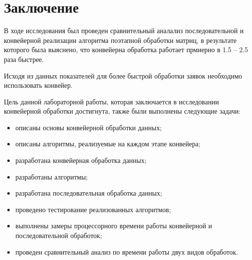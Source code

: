 \chapter*{Заключение}

В ходе исследования был проведен сравнительный аналализ последовательной и
конвейерной реализации алгоритма поэтапной обработки матриц, в результате
которого была выяснено, что конвейерна обработка работает прмиерно в 1.5 -- 2.5 раза 
быстрее. 

Исходя из данных показателей для более быстрой обработки заявок необходимо использовать
конвейер.

Цель данной лабораторной работы, которая заключается в исследовании
конвейерной обработки достигнута, также были выполнены следующие задачи:
\begin{itemize}[left=\parindent]
    \item описаны основы конвейерной обработки данных;
    \item описаны алгоритмы, реализуемые на каждом этапе конвейера;
    \item разработана конвейерная обработка данных;
    \item разработаны алгоритмы;
    \item разработана последовательная обработка данных;
    \item проведено тестирование реализованных алгоритмов;
	\item выполнены замеры процессорного времени работы конвейерной и последовательной обработок;
	\item проведен сравнительный анализ по времени работы двух видов обработок.
\end{itemize}
